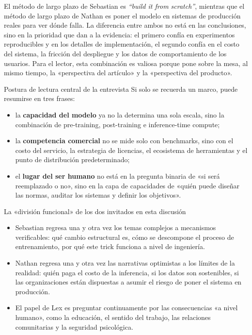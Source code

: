 \documentclass[a4paper]{article}
\begin{document}
El método de largo plazo de Sebastian es \textit{``build it from scratch''}, mientras que el método de largo plazo de Nathan es poner el modelo en sistemas de producción reales para ver dónde falla. La diferencia entre ambos no está en las conclusiones, sino en la prioridad que dan a la evidencia: el primero confía en experimentos reproducibles y en los detalles de implementación, el segundo confía en el costo del sistema, la fricción del despliegue y los datos de comportamiento de los usuarios. Para el lector, esta combinación es valiosa porque pone sobre la mesa, al mismo tiempo, la «perspectiva del artículo» y la «perspectiva del producto».

\begin{importantbox}{Postura de lectura central de la entrevista}
Si solo se recuerda un marco, puede resumirse en tres frases:
\begin{itemize}[leftmargin=1.5em]
    \item la \textbf{capacidad del modelo} ya no la determina una sola escala, sino la combinación de pre-training, post-training e inference-time compute;
    \item la \textbf{competencia comercial} no se mide solo con benchmarks, sino con el costo del servicio, la estrategia de licencias, el ecosistema de herramientas y el punto de distribución predeterminado;
    \item el \textbf{lugar del ser humano} no está en la pregunta binaria de «si será reemplazado o no», sino en la capa de capacidades de «quién puede diseñar las normas, auditar los sistemas y definir los objetivos».
\end{itemize}
\end{importantbox}

\begin{knowledgebox}{La «división funcional» de los dos invitados en esta discusión}
\begin{itemize}[leftmargin=1.5em]
    \item Sebastian regresa una y otra vez los temas complejos a mecanismos verificables: qué cambio estructural es, cómo se descompone el proceso de entrenamiento, por qué este trick funciona a nivel de ingeniería.
    \item Nathan regresa una y otra vez las narrativas optimistas a los límites de la realidad: quién paga el costo de la inferencia, si los datos son sostenibles, si las organizaciones están dispuestas a asumir el riesgo de poner el sistema en producción.
    \item El papel de Lex es preguntar continuamente por las consecuencias «a nivel humano», como la educación, el sentido del trabajo, las relaciones comunitarias y la seguridad psicológica.
\end{itemize}
\end{knowledgebox}
\end{document}
